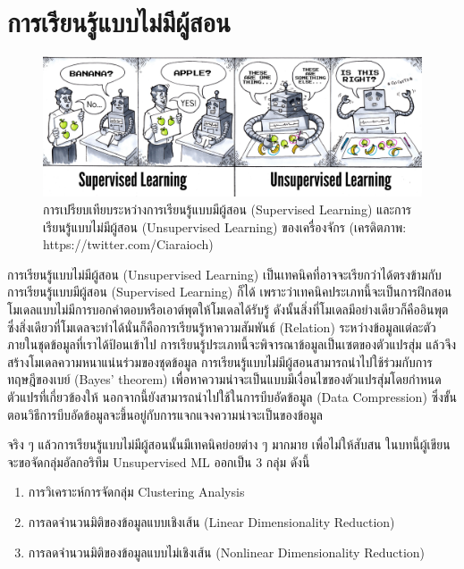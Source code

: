 

\chapter{การเรียนรู้แบบไม่มีผู้สอน}
\label{ch:unsup_ml}

\begin{figure}[H]
    \centering
    \includegraphics[width=0.9\linewidth]{fig/sup_vs_unsup_ml.jpeg}
    \caption{การเปรียบเทียบระหว่างการเรียนรู้แบบมีผู้สอน (Supervised Learning) และการเรียนรู้แบบไม่มีผู้สอน (Unsupervised Learning) ของเครื่องจักร (เครดิตภาพ: https://twitter.com/Ciaraioch)}
    \label{fig:sup_vs_unsup_ml}
\end{figure}

การเรียนรู้แบบไม่มีผู้สอน (Unsupervised Learning) เป็นเทคนิคที่อาจจะเรียกว่าได้ตรงข้ามกับการเรียนรู้แบบมีผู้สอน (Supervised Learning) ก็ได้ เพราะว่าเทคนิคประเภทนี้จะเป็นการฝึกสอนโมเดลแบบไม่มีการบอกคำตอบหรือเอาต์พุตให้โมเดลได้รับรู้ ดังนั้นสิ่งที่โมเดลมีอย่างเดียวก็คืออินพุต ซึ่งสิ่งเดียวที่โมเดลจะทำได้นั่นก็คือการเรียนรู้หาความสัมพันธ์ (Relation) ระหว่างข้อมูลแต่ละตัวภายในชุดข้อมูลที่เราได้ป้อนเข้าไป การเรียนรู้ประเภทนี้จะพิจารณาข้อมูลเป็นเซตของตัวแปรสุ่ม แล้วจึงสร้างโมเดลความหนาแน่นร่วมของชุดข้อมูล การเรียนรู้แบบไม่มีผู้สอนสามารถนำไปใช้ร่วมกับการทฤษฎีของเบย์ (Bayes' theorem) เพื่อหาความน่าจะเป็นแบบมีเงื่อนไขของตัวแปรสุ่มโดยกำหนดตัวแปรที่เกี่ยวข้องให้ นอกจากนี้ยังสามารถนำไปใช้ในการบีบอัดข้อมูล (Data Compression) ซึ่งขั้นตอนวิธีการบีบอัดข้อมูลจะขึ้นอยู่กับการแจกแจงความน่าจะเป็นของข้อมูล

จริง ๆ แล้วการเรียนรู้แบบไม่มีผู้สอนนั้นมีเทคนิคย่อยต่าง ๆ มากมาย เพื่อไม่ให้สับสน ในบทนี้ผู้เขียนจะขอจัดกลุ่มอัลกอริทึม Unsupervised ML ออกเป็น 3 กลุ่ม ดังนี้
%
\begin{enumerate}[topsep=0pt,noitemsep]\setlength\itemsep{0.5em}
    \item การวิเคราะห์การจัดกลุ่ม Clustering Analysis

    \item การลดจำนวนมิติของข้อมูลแบบเชิงเส้น (Linear Dimensionality Reduction)

    \item การลดจำนวนมิติของข้อมูลแบบไม่เชิงเส้น (Nonlinear Dimensionality Reduction)
\end{enumerate}

